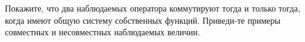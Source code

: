 \documentclass[__main__.tex]{subfiles}
\begin{document}
Покажите, что два наблюдаемых оператора коммутируют тогда и только тогда, когда имеют общую систему собственных функций. Приведи-те примеры совместных и несовместных наблюдаемых величин.\\ 

\end{document}
